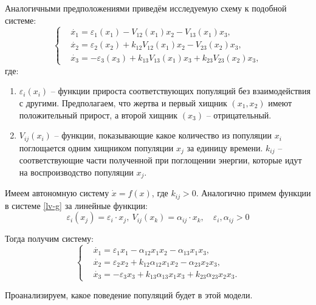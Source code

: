     Аналогичными предположениями приведём исследуемую схему к подобной системе:   
    \begin{equation}
        \left\{\begin{split}
            & \dot{x_1} = \varepsilon_1(x_1) - V_{12}(x_1)x_2 - V_{13}(x_1)x_3, \\
            & \dot{x_2} = \varepsilon_2(x_2) + k_{12} V_{12}(x_1)x_2 - V_{23}(x_2)x_3, \\
            & \dot{x_3} = -\varepsilon_3(x_3) + k_{13} V_{13}(x_1)x_3 + k_{23} V_{23}(x_2)x_3,
        \end{split}\right. \label{lv-g}
    \end{equation}
    где:
    \begin{enumerate}
        \item \( \varepsilon_i(x_i) \) -- функции прироста соответствующих популяций без взаимодействия с другими. Предполагаем, что жертва и первый хищник \(( x_1, x_2) \) имеют положительный прирост, а второй хищник \(( x_3 )\) -- отрицательный.
        \item \( V_{ij} (x_i) \) -- функции, показывающие какое количество из популяции \(x_i\) поглощается одним хищником популяции \( x_j \) за единицу времени. \(k_{ij}\) -- соответствующие части полученной при поглощении энергии, которые идут на воспроизводство популяции \(x_j\).
    \end{enumerate}
 
    Имеем автономную систему \( \dot{x} = f(x) \), где \( k_{ij} > 0 \). Аналогично примем функции в системе \eqref{lv-g} за линейные функции: 
    \[ \varepsilon_i(x_j) = \varepsilon_i \cdot x_j, ~ V_{ij}(x_k) = \alpha_{ij} \cdot x_k, \quad \varepsilon_i, \alpha_{ij} > 0 \]

    Тогда получим систему:
    \begin{equation}
        \left\{\begin{split}
            & \dot{x_1} = \varepsilon_1 x_1 - \alpha_{12} x_1 x_2 - \alpha_{13} x_1 x_3, \\
            & \dot{x_2} = \varepsilon_2 x_2 + k_{12} \alpha_{12} x_1 x_2 - \alpha_{23} x_2 x_3, \\
            & \dot{x_3} = -\varepsilon_3 x_3 + k_{13} \alpha_{13} x_1 x_3 + k_{23} \alpha_{23} x_2 x_3. 
        \end{split}\right. \label{lv-gl}
    \end{equation}

    Проанализируем, какое поведение популяций будет в этой модели.